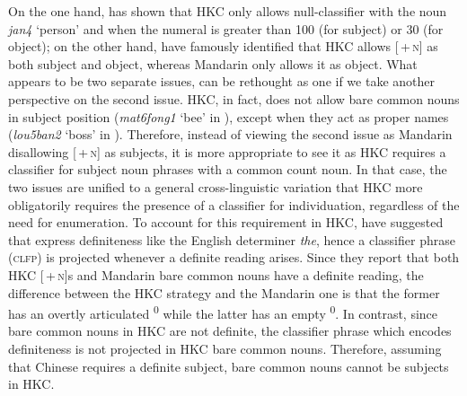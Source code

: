 \documentclass[output=paper]{langsci/langscibook}
\begin{document}
On the one hand,  has shown that \gls{HKC} only allows null-classifier  with the noun
\emph{jan4} ‘person’ and when the numeral is greater than 100 (for subject) or
30 (for object); on the other hand, \citet{ChengSybesma1999} have famously
identified that \gls{HKC} allows [\Clf{}\,+\,\textsc{n}]
as both subject and object, whereas Mandarin only allows it as
object.  What appears to be two separate issues, can be rethought as one if we
take another perspective on the second issue. \gls{HKC}, in fact, does not allow bare common nouns in subject position
(\emph{mat6fong1} \enquote*{bee} in ), except when they act as
proper names (\emph{lou5ban2} \enquote*{boss} in ).  Therefore,
instead of viewing the second issue as Mandarin disallowing
[\Clf{}\,+\,\textsc{n}] as subjects, it is more appropriate to see it as
\gls{HKC} requires a classifier for
subject noun phrases with a common count noun. In that case, the two issues are
unified to a general cross-linguistic variation that \gls{HKC} more obligatorily requires the presence of a
classifier for individuation, regardless of the need for
enumeration. To account for this requirement in \gls{HKC}, \citet{ChengSybesma1999} have suggested that 
express definiteness like the English determiner \emph{the}, hence a
classifier phrase (\textsc{clfp}) is projected whenever a definite
reading arises. Since they report that both \gls{HKC} [\Clf{}\,+\,\textsc{n}]s
and Mandarin bare common nouns have a definite reading, the
difference between the \gls{HKC} strategy and the
Mandarin one is that the former has an overtly articulated
\Clf{}\textsuperscript{0} while the latter has an empty
\Clf{}\textsuperscript{0}. In contrast, since bare common nouns in \gls{HKC}
are not definite, the classifier phrase which encodes
definiteness is not projected in \gls{HKC} bare common
nouns. Therefore, assuming that Chinese requires a definite subject, bare
common nouns cannot be subjects in \gls{HKC}.
\end{document}
